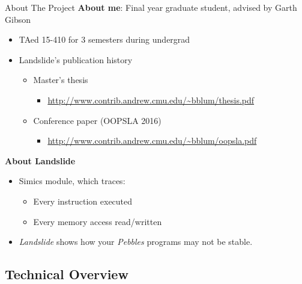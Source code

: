 \documentclass[xcolor=dvipsnames]{beamer}
\begin{document}
\begin{frame}{About The Project}
	\textbf{About me}: Final year graduate student, advised by Garth Gibson
	\begin{itemize}
		\item TAed 15-410 for 3 semesters during undergrad
		\item Landslide's publication history
		\begin{itemize}
			\item Master's thesis
			\begin{itemize}
				\item \url{http://www.contrib.andrew.cmu.edu/~bblum/thesis.pdf}
			\end{itemize}
			\item Conference paper (OOPSLA 2016)
			\begin{itemize}
				\item \url{http://www.contrib.andrew.cmu.edu/~bblum/oopsla.pdf}
			\end{itemize}
		\end{itemize}
	\end{itemize}
	\pause
	\linegap

	{\bf About Landslide}
	\begin{itemize}
		\item Simics module, which traces:
			\begin{itemize}
				\item Every instruction executed
				\item Every memory access read/written
			\end{itemize}
		\item {\em Landslide} shows how your {\em Pebbles} programs may not be stable.
	\end{itemize}
\end{frame}


\subsection{Technical Overview}
\end{document}
